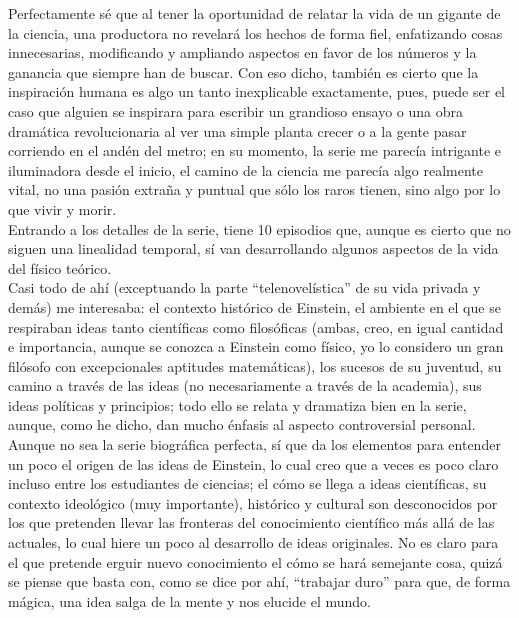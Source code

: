 \documentclass{article}
\begin{document}
Perfectamente sé que al tener la oportunidad de relatar la vida de un gigante de la ciencia, una productora no revelará los hechos de forma fiel, enfatizando cosas innecesarias, modificando y ampliando aspectos en favor de los números y la ganancia que siempre han de buscar. Con eso dicho, también es cierto que la inspiración humana es algo un tanto inexplicable exactamente, pues, puede ser el caso que alguien se  inspirara para escribir un grandioso ensayo o una obra dramática revolucionaria al ver una simple planta crecer o a la gente pasar corriendo en el andén del metro; en su momento, la serie me parecía intrigante e iluminadora desde el inicio, el camino de la ciencia me parecía algo realmente vital, no una pasión extraña y puntual que sólo los raros tienen, sino algo por lo que vivir y morir.\\

Entrando a los detalles de la serie, tiene 10 episodios que, aunque es cierto que no siguen una linealidad temporal, sí van desarrollando algunos aspectos de la vida del físico teórico.\\
Casi todo de ahí (exceptuando la parte ``telenovelística'' de su vida privada y demás) me interesaba: el contexto histórico de Einstein, el ambiente en el que se respiraban ideas tanto científicas como filosóficas (ambas, creo, en igual cantidad e importancia, aunque se conozca a Einstein como físico, yo lo considero un gran filósofo con excepcionales aptitudes matemáticas), los sucesos de su juventud, su camino a través de las ideas (no necesariamente a través de la academia), sus ideas políticas y principios; todo ello se relata y dramatiza bien en la serie, aunque, como he dicho, dan mucho énfasis al aspecto controversial personal.\\

Aunque no sea la serie biográfica perfecta, sí que da los elementos para entender un poco el origen de las ideas de Einstein, lo cual creo que a veces es poco claro incluso entre los estudiantes de ciencias; el cómo se llega a ideas científicas, su contexto ideológico (muy importante), histórico y cultural son desconocidos por los que pretenden llevar las fronteras del conocimiento científico más allá de las actuales, lo cual hiere un poco al desarrollo de ideas originales. No es claro para el que pretende erguir nuevo conocimiento el cómo se hará semejante cosa, quizá se piense que basta con, como se dice por ahí, ``trabajar duro'' para que, de forma mágica, una idea salga de la mente y nos elucide el mundo. \\
\end{document}
